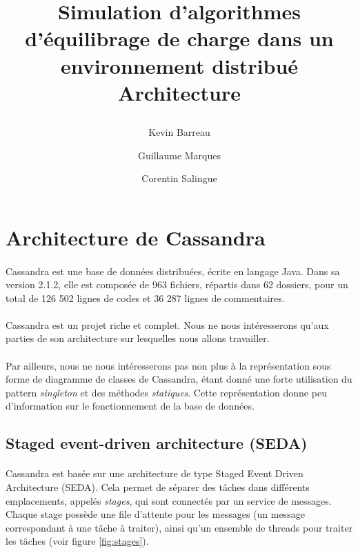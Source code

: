 \documentclass[12pt]{article}
\title{
 \begin{minipage}\linewidth
        \centering
        Simulation d'algorithmes d'équilibrage de charge dans un environnement distribué 
        \vskip3pt
        \large Architecture
    \end{minipage}
 }
\author{Kevin Barreau \and Guillaume Marques \and Corentin Salingue}
\begin{document}
\maketitle

\newpage

\renewcommand{\contentsname}{Sommaire} 
\tableofcontents

\newpage

\section{Architecture de Cassandra}

\paragraph{} Cassandra est une base de données distribuées, écrite en langage Java. Dans sa version 2.1.2, elle est composée de 963 fichiers, répartis dans 62 dossiers, pour un total de 126 502 lignes de codes et 36 287 lignes de commentaires.

\paragraph{} Cassandra est un projet riche et complet. Nous ne nous intéresserons qu'aux parties de son architecture sur lesquelles nous allons travailler.

\paragraph{} Par ailleurs, nous ne nous intéresserons pas non plus à la représentation sous forme de diagramme de classes de Cassandra, étant donné une forte utilisation du pattern \textit{singleton} et des méthodes \textit{statiques}. Cette représentation donne peu d'information sur le fonctionnement de la base de données.

\subsection{Staged event-driven architecture (SEDA)}

\paragraph{} Cassandra est basée sur une architecture de type Staged Event Driven Architecture (SEDA). Cela permet de séparer des tâches dans différents emplacements, appelés \textit{stages}, qui sont connectés par un service de messages. Chaque stage possède une file d'attente pour les messages (un message correspondant à une tâche à traiter), ainsi qu'un ensemble de threads pour traiter les tâches (voir figure \ref{fig:stages}).
\end{document}

